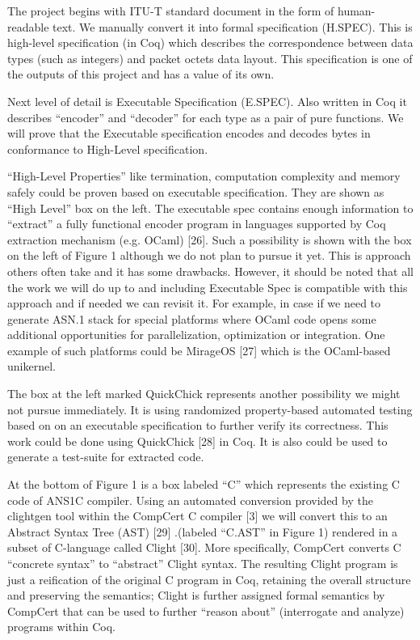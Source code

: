 \documentclass[acmsmall,nonacm]{acmart}
\begin{document}
The project begins with ITU-T standard document in the form of human-readable text.
We manually convert it into formal specification (H.SPEC). This is high-level specification (in Coq) which describes the correspondence between data types (such as integers) and packet octets data layout. This specification is one of the outputs of this project and has a value of its own.


Next level of detail is Executable Specification (E.SPEC). Also written in Coq it describes ``encoder'' and ``decoder'' for each type as a pair of pure functions. We will prove that the Executable specification encodes and decodes bytes in conformance to High-Level specification.

``High-Level Properties'' like termination, computation complexity and memory safely could be proven based on executable specification. They are shown as ``High Level”  box on the left. The executable spec contains enough information to ``extract” a fully functional encoder program in languages supported by Coq extraction mechanism (e.g. OCaml) [26]. Such a possibility is shown with the box on the left of Figure 1 although we do not plan to pursue it yet. This is approach others often take and it has some drawbacks. However, it should be noted that all the work we will do up to and including Executable Spec is compatible with this approach and if needed we can revisit it. For example, in case if we need to generate ASN.1 stack for special platforms where OCaml code opens some additional opportunities for parallelization, optimization or integration. One example of such platforms could be MirageOS [27]  which is the OCaml-based unikernel.

The box at the left marked QuickChick represents another possibility we might not pursue immediately. It is using randomized property-based automated testing based on on an executable specification to further verify its correctness. This work could be done using  QuickChick [28] in Coq. It is also could be used to generate a test-suite for extracted code.

At the bottom of Figure 1 is a box labeled ``C'' which represents the existing C code of ANS1C compiler. Using an automated conversion provided by the clightgen tool within the CompCert C compiler [3] we will convert this to an Abstract Syntax Tree (AST) [29] .(labeled ``C.AST'' in Figure 1) rendered in a subset of C-language called Clight [30]. More specifically, CompCert converts C ``concrete syntax'' to ``abstract'' Clight syntax. The resulting Clight program is just a reification of the original C program in Coq, retaining the overall structure and preserving the semantics; Clight is further assigned formal semantics by CompCert that can be used to further ``reason about'' (interrogate and analyze) programs within  Coq.
\end{document}
